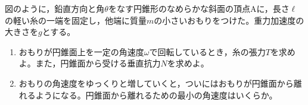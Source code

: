 \hakosyokika
\item
    \begin{mawarikomi}{150pt}{}
        図のように，鉛直方向と角$\theta $をなす円錐形のなめらかな斜面の頂点Aに，長さ$\ell $の軽い糸の一端を固定し，他端に質量$m$の小さいおもりをつけた。重力加速度の大きさを$g$とする。
        \begin{enumerate}
            \item おもりが円錐面上を一定の角速度$\omega $で回転しているとき，糸の張力$T$を求めよ。また，円錐面から受ける垂直抗力$N$を求めよ。
            \item おもりの角速度をゆっくりと増していくと，ついにはおもりが円錐面から離れるようになる。円錐面から離れるための最小の角速度はいくらか。
        \end{enumerate}
    \end{mawarikomi}